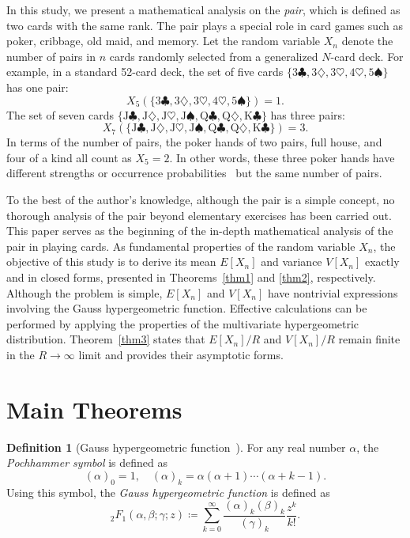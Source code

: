 \documentclass[pre, amsmath, floatfix]{revtex4-2}
\theoremstyle{plain}
\theoremstyle{definition}
\newtheorem{definition}{Definition}[section]
\theoremstyle{remark}
\newcommand{\E}[1]{E\left[#1\right]} %
\newcommand{\Var}[1]{V\left[#1\right]} %
\newcommand{\GaussFsymbol}{{}_2F_1} %
\newcommand{\GaussF}[4]{\GaussFsymbol\left(#1, #2; #3; #4\right)} %
\begin{document}
In this study, we present a mathematical analysis on the \emph{pair}, which is defined as two cards with the same rank.
The pair plays a special role in card games such as poker, cribbage, old maid, and memory.
Let the random variable $X_n$ denote the number of pairs in $n$ cards randomly selected from a generalized $N$-card deck.
For example, in a standard 52-card deck, the set of five cards $\{3\clubsuit, 3\diamondsuit, 3\heartsuit, 4\heartsuit, 5\spadesuit\}$ has one pair:
\[
X_5(\{3\clubsuit, 3\diamondsuit, 3\heartsuit, 4\heartsuit, 5\spadesuit\})=1.
\]
The set of seven cards $\{\mathrm{J}\clubsuit, \mathrm{J}\diamondsuit, \mathrm{J}\heartsuit, \mathrm{J}\spadesuit, \mathrm{Q}\clubsuit, \mathrm{Q}\diamondsuit, \mathrm{K}\clubsuit\}$ has three pairs:
\[
X_7(\{\mathrm{J}\clubsuit, \mathrm{J}\diamondsuit, \mathrm{J}\heartsuit, \mathrm{J}\spadesuit, \mathrm{Q}\clubsuit, \mathrm{Q}\diamondsuit, \mathrm{K}\clubsuit\})=3.
\]
In terms of the number of pairs, the poker hands of two pairs, full house, and four of a kind all count as $X_5=2$.
In other words, these three poker hands have different strengths or occurrence probabilities~\cite{Epstein} but the same number of pairs.

To the best of the author's knowledge, although the pair is a simple concept, no thorough analysis of the pair beyond elementary exercises has been carried out.
This paper serves as the beginning of the in-depth mathematical analysis of the pair in playing cards.
As fundamental properties of the random variable $X_n$, the objective of this study is to derive its mean $\E{X_n}$ and variance $\Var{X_n}$ exactly and in closed forms, presented in Theorems~\ref{thm1} and \ref{thm2}, respectively.
Although the problem is simple, $\E{X_n}$ and $\Var{X_n}$ have nontrivial expressions involving the Gauss hypergeometric function.
Effective calculations can be performed by applying the properties of the multivariate hypergeometric distribution.
Theorem~\ref{thm3} states that $\E{X_n}/R$ and $\Var{X_n}/R$ remain finite in the $R\to\infty$ limit and provides their asymptotic forms.

\section{Main Theorems}
\begin{definition}[Gauss hypergeometric function~\cite{Olver}]
For any real number $\alpha$, the \emph{Pochhammer symbol} is defined as
\begin{equation}
(\alpha)_0=1,\quad (\alpha)_k=\alpha(\alpha+1)\cdots(\alpha+k-1).
\label{eq:Pochhammer}
\end{equation}
Using this symbol, the \emph{Gauss hypergeometric function} is defined as
\[
\GaussF{\alpha}{\beta}{\gamma}{z}\coloneqq\sum_{k=0}^\infty \frac{(\alpha)_k (\beta)_k}{(\gamma)_k}\frac{z^k}{k!}.
\]
\end{definition}
\end{document}
